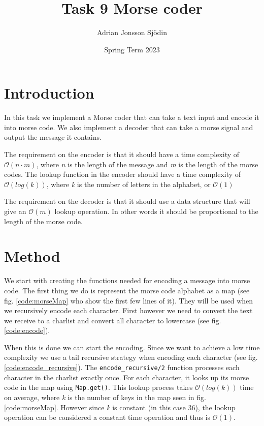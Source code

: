 \documentclass[a4paper,11pt]{article}
\begin{document}
\title{
    \textbf{Task 9 Morse coder}
}
\author{Adrian Jonsson Sjödin}
\date{Spring Term 2023}

\maketitle

\section*{Introduction}
In this task we implement a Morse coder that can take a text input and encode it into morse code. We also implement a decoder that 
can take a morse signal and output the message it contains. 

The requirement on the encoder is that it should have a time complexity 
of $\mathcal{O}(n\cdot m)$, where \textit{n} is the length of the message and \textit{m} is the length of the morse codes. The lookup 
function in the encoder should have a time complexity of $\mathcal{O}(log(k))$, where \textit{k} is the number of letters in the 
alphabet, or $\mathcal{O}(1)$

The requirement on the decoder is that it should use a data structure that will give an $\mathcal{O}(m)$ lookup operation. In other words 
it should be proportional to the length of the morse code.

\section*{Method}
We start with creating the functions needed for encoding a message into morse code. The first thing we do is represent the morse code 
alphabet as a map (see fig. \ref{code:morseMap} who show the first few lines of it). They will be used when we recursively encode each
character. First however we need to convert the text we receive to a charlist and convert all character to lowercase (see fig. \ref{code:encode}). 

When this is done 
we can start the encoding. Since we want to achieve a low time complexity we use a tail recursive strategy when encoding each character 
(see fig. \ref{code:encode_recursive}). The {\tt encode\_recursive/2} function processes each character in the charlist exactly once. 
For each character, it looks up its morse code in the map using {\tt Map.get()}. This lookup process takes $\mathcal{O}(log(k))$ time 
on average, where \textit{k} is the number of keys in the map seen in fig. \ref{code:morseMap}. However since \textit{k} is constant 
(in this case 36), the lookup operation can be considered a constant time operation and thus is $\mathcal{O}(1)$.
\end{document}
